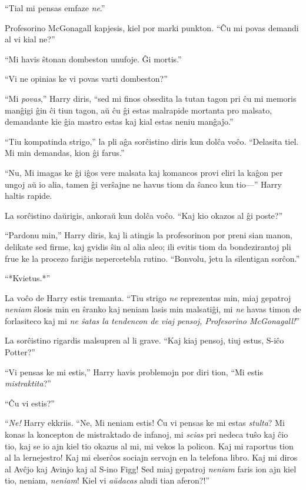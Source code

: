 ``Tial mi pensas emfaze \emph{ne}.''

Profesorino McGonagall kapjesis, kiel por marki punkton. ``Ĉu mi povas
demandi al vi kial ne?''

``Mi havis ŝtonan dombeston unufoje. Ĝi mortis.''

``Vi ne opinias ke vi povas varti dombeston?''

``Mi \emph{povas},'' Harry diris, ``sed mi finos obsedita la tutan
tagon pri ĉu mi memoris manĝigi ĝin ĉi tiun tagon, aŭ ĉu ĝi estas
malrapide mortanta pro malsato, demandante kie ĝia mastro estas kaj
kial estas neniu manĝaĵo.''

``Tiu kompatinda strigo,'' la pli aĝa sorĉistino diris kun dolĉa
voĉo. ``Delasita tiel. Mi min demandas, kion ĝi farus.''

``Nu, Mi imagas ke ĝi iĝos vere malsata kaj komancos provi eliri la
kaĝon per ungoj aŭ io alia, tamen ĝi verŝajne ne havus tiom da ŝanco
kun tio—'' Harry haltis rapide.

La sorĉistino daŭrigis, ankoraŭ kun dolĉa voĉo. ``Kaj kio okazos al ĝi
poste?''

``Pardonu min,'' Harry diris, kaj li atingis la profesorinon por preni
sian manon, delikate sed firme, kaj gvidis ŝin al alia aleo; ili
evitis tiom da bondezirantoj pli frue ke la procezo fariĝis
nepercetebla rutino. ``Bonvolu, ĵetu la silentigan sorĉon.''

``*Kvietus.*''

La voĉo de Harry estis tremanta. ``Tiu strigo \emph{ne} reprezentas
min, miaj gepatroj \emph{neniam} ŝlosis min en ŝranko kaj neniam lasis
min malsatiĝi, mi \emph{ne} havas timon de forlasiteco kaj mi
\emph{ne ŝatas la tendencon de viaj pensoj, Profesorino McGonagall!}''

La sorĉistino rigardis malsupren al li grave. ``Kaj kiaj pensoj, tiuj estus, S-iĉo Potter?''

``Vi pensas ke mi estis,'' Harry havis problemojn por diri tion, ``Mi
estis \emph{mistraktita}?''

``Ĉu vi estis?''

``\emph{Ne!} Harry ekkriis. ``Ne, Mi neniam estis! Ĉu vi pensas ke mi
estas \emph{stulta}?  Mi konas la koncepton de mistraktado de infanoj,
mi \emph{scias} pri nedeca tuŝo kaj ĉio tio, kaj se io ajn kiel tio
okazus al mi, mi vekos la policon. Kaj mi raportus tion al la
lernejestro! Kaj mi elserĉos sociajn servojn en la telefona libro. Kaj
mi diros al Avĉjo kaj Avinjo kaj al S-ino Figg! Sed miaj gepatroj
\emph{neniam} faris ion ajn kiel tio, neniam, \emph{neniam}! Kiel vi
\emph{aŭdacas} aludi tian aferon?!''

